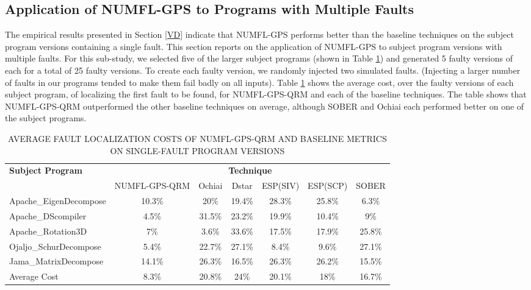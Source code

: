 \documentclass[times]{stvrauth}
\begin{document}
\subsection{Application of NUMFL-GPS to Programs with Multiple Faults}
The empirical results presented in Section \ref{VD} indicate that NUMFL-GPS performs better than the baseline techniques on the subject program versions containing a single fault.  This section reports on the application of NUMFL-GPS to subject program versions with multiple faults.  For this sub-study, we selected five of the larger subject programs (shown in Table \ref{table4}) and generated 5 faulty versions of each for a total of 25 faulty versions.  To create each faulty version, we randomly injected two simulated faults. (Injecting a larger number of faults in our programs tended to make them fail badly on all inputs).  Table \ref{table4} shows the average cost, over the faulty versions of each subject program, of localizing the first fault to be found, for NUMFL-GPS-QRM and each of the baseline techniques.  The table shows that NUMFL-GPS-QRM outperformed the other baseline techniques on average, although SOBER and Ochiai each performed better on one of the subject programs.
\begin{table}[htbp!]
\fontsize{8pt}{9pt}\selectfont
\centering
\caption{AVERAGE FAULT LOCALIZATION COSTS OF NUMFL-GPS-QRM AND BASELINE METRICS ON SINGLE-FAULT PROGRAM VERSIONS}
\label{table4}
      \begin{tabular}{|l|c|c|c|c|c|c|}
      \hline
\multirow{2}{*}{{\bf Subject Program}}	&	\multicolumn{6}{|c|}{{\bf Technique}}	\\	\cline{2-7}
&{NUMFL-GPS-QRM}	&Ochiai&	Dstar&	ESP(SIV) &	ESP(SCP)	&SOBER \\\hline
Apache\_EigenDecompose	&	10.3\%	&	20\%	&	19.4\%	&	28.3\%	&	25.8\%	&	6.3\%	\\	\hline
Apache\_DScompiler	&	4.5\%	&	31.5\%	&	23.2\%	&	19.9\%	&	10.4\%	&	9\%	\\	\hline
Apache\_Rotation3D	&	7\%	&	3.6\%	&	33.6\%	&	17.5\%	&	17.9\%	&	25.8\%	\\	\hline
Ojaljo\_SchurDecompose	&	5.4\%	&	22.7\%	&	27.1\%	&	8.4\%	&	9.6\%	&	27.1\%	\\	\hline
Jama\_MatrixDecompose	&	14.1\%	&	26.3\%	&	16.5\%	&	26.3\%	&	26.2\%	&	15.5\%	\\	\hline
Average Cost	&	8.3\%	&	20.8\%	&	24\%	&	20.1\%	&	18\%	&	16.7\%	\\	\hline
\end{tabular}
\end{table}
\end{document}
